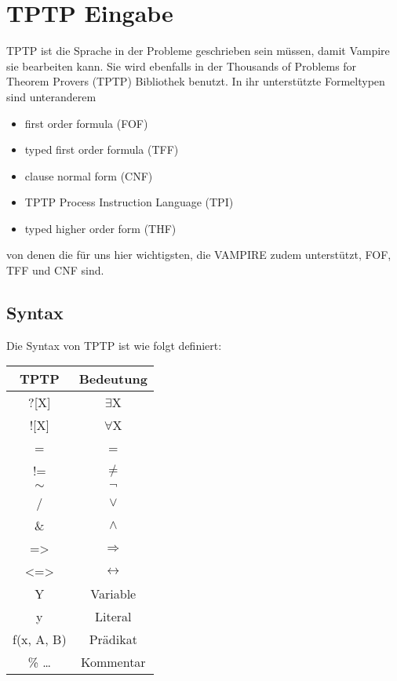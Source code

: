 \documentclass{article}
\begin{document}
\section{TPTP Eingabe}
\label{sec:input}

TPTP ist die Sprache in der Probleme geschrieben sein müssen, damit Vampire sie bearbeiten kann. Sie wird ebenfalls in der Thousands of Problems for Theorem Provers (TPTP) Bibliothek benutzt.
In ihr unterstützte Formeltypen sind unteranderem 
\begin{itemize}
	\item first order formula (FOF)
	\item typed first order formula (TFF)
	\item clause normal form (CNF)
	\item TPTP Process Instruction Language  (TPI)
	\item typed higher order form (THF)
\end{itemize}
von denen die für uns hier wichtigsten, die VAMPIRE zudem unterstützt, FOF, TFF und CNF sind.

\subsection{Syntax}
\label{subsec:syntax}
Die Syntax von TPTP ist wie folgt definiert:

\begin{tabular}{|c|c|}
	\hline TPTP & Bedeutung \\ 
	\hline ?[X] & $\exists$X \\
	\hline ![X] & $\forall$X \\
	\hline = & = \\
	\hline != & $\neq$ \\
	\hline $\sim$ & $\lnot$ \\
	\hline / & $\lor$ \\
	\hline \& & $\land$ \\
	\hline => & $\Rightarrow$ \\
	\hline <=> & $\leftrightarrow$ \\
	\hline Y & Variable \\
	\hline y & Literal \\
	\hline f(x, A, B) & Prädikat \\
	\hline \% \dots & Kommentar \\
	\hline
\end{tabular} 
\end{document}
